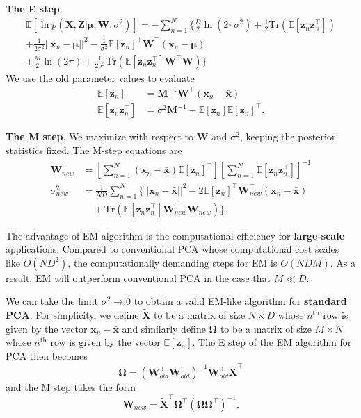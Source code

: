\documentclass[a4paper]{report}
\newcommand{\up}{\mathrm}
\renewcommand{\bf}{\mathbf}
\newcommand{\bb}{\mathbb}
\newcommand{\bs}{\boldsymbol}
\begin{document}
\textbf{The E step}. \begin{align}
\bb{E}[\ln p(\bf{X,Z}|\bs{\mu},\bf{W},\sigma^2)] = -\sum_{n=1}^N \{ \frac{D}{2}\ln (2\pi\sigma^2)+\frac{1}{2}\up{Tr}(\bb{E}[\bf{z}_n\bf{z}_n^{\intercal}])\\ +\frac{1}{2\sigma^2}||\bf{x}_n-\bs{\mu}||^2-\frac{1}{\sigma^2}\bb{E}[\bf{z}_n]^{\intercal} \bf{W}^{\intercal}(\bf{x}_n-\bs{\mu})\\+\frac{M}{2}\ln (2\pi)+\frac{1}{2\sigma^2}\up{Tr}(\bb{E}[\bf{z}_n\bf{z}_n^{\intercal}]\bf{W}^{\intercal}\bf{W}) \}
\end{align}
We use the old parameter values to evaluate
\begin{align}
	\bb{E}[\bf{z}_n] &= \bf{M}^{-1} \bf{W}^{\intercal} (\bf{x}_n-\bar{\bf{x}}) \label{PCAE1}\\
	\bb{E}[\bf{z}_n\bf{z}_n^{\intercal}] &= \sigma^2 \bf{M}^{-1} + \bb{E}[\bf{z}_n] \bb{E}[\bf{z}_n]^{\intercal}. \label{PCAE2}
\end{align}

\textbf{The M step}. We maximize with respect to $\bf{W}$ and $\sigma^2$, keeping the posterior statistics fixed. The M-step equations are
\begin{align}
	\bf{W}_{new} &= \left[ \sum_{n=1}^N (\bf{x}_n-\bar{\bf{x}})\bb{E}[\bf{z}_n]^{\intercal} \right]\left[
	\sum_{n=1}^N \bb{E}[\bf{z}_n\bf{z}_n^{\intercal}]\right]^{-1} \\
	\sigma_{new}^2 &= \frac{1}{ND} \sum_{n=1}^N \{ ||\bf{x}_n-\bar{\bf{x}}||^2 - 2\bb{E}[\bf{z}_n]^{\intercal} \bf{W}_{new}^{\intercal}(\bf{x}_n-\bar{\bf{x}})\\
	&\quad + \up{Tr}(\bb{E}[\bf{z}_n\bf{z}_n^{\intercal}]\bf{W}_{new}^{\intercal}\bf{W}_{new}) \}.\label{PCAM1}
\end{align}

The advantage of EM algorithm is the computational efficiency for \textbf{large-scale} applications. Compared to conventional PCA whose computational cost scales like $O(ND^2)$, the computationally demanding steps for EM is $O(NDM)$. As a result, EM will outperform conventional PCA in the case that $M\ll D$.

We can take the limit $\sigma^2 \rightarrow 0$ to obtain a valid EM-like algorithm for \textbf{standard PCA}. For simplicity, we define $\tilde{\bf{X}}$ to be a matrix of size $N \times D$ whose $n^{\up{th}}$ row is given by the vector $\bf{x}_n - \bar{\bf{x}}$ and similarly define $\bs{\Omega}$ to be a matrix of size $M \times N$ whose $n^{\up{th}}$ row is given by the vector $\bb{E}[\bf{z}_n]$. The E step of the EM algorithm for PCA then becomes
\begin{equation}
	\bs{\Omega} = (\bf{W}_{old}^{\intercal} \bf{W}_{old})^{-1}\bf{W}_{old}^{\intercal} \tilde{\bf{X}}^{\intercal}
\end{equation}
and the M step takes the form
\begin{equation}
	\bf{W}_{new} = \tilde{\bf{X}}^{\intercal} \bs{\Omega}^{\intercal} (\bs{\Omega}\bs{\Omega}^{\intercal})^{-1}.
\end{equation}
\end{document}
